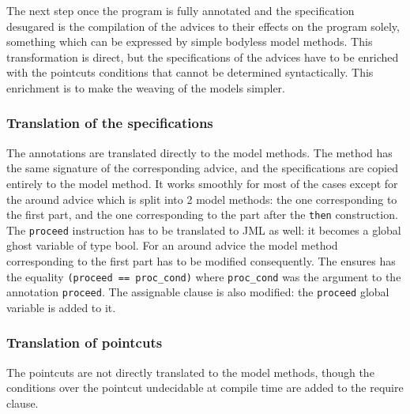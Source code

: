 The next step once the program is fully annotated and the specification desugared is the compilation of the
advices to their effects on the program solely, something  which can be expressed by simple bodyless model 
methods.
This transformation is direct, but the specifications of the advices have to be
 enriched with the pointcuts conditions that cannot be determined syntactically.
This enrichment is to make the weaving of the models simpler.

\subsubsection{Translation of the specifications}
The annotations are translated directly to the model methods. The method has the same signature
 of the corresponding advice, and the specifications are copied entirely to the model method. It works smoothly
for most of the cases except for the around advice which is split into 2 model methods: the one corresponding
to the first part, and the one corresponding to the part after the {\tt then} construction. 
The {\tt proceed} instruction has to be translated to JML as well: it becomes a global 
ghost variable of type bool.
For an around advice the model method corresponding to the first part has to be modified consequently.
The ensures has the equality {\tt (proceed == proc\_cond)} where {\tt proc\_cond} was the argument 
to the annotation {\tt proceed}. The assignable clause is also modified: the {\tt proceed} global variable is 
added to it.
\subsubsection{Translation of pointcuts}
The pointcuts are not directly translated to the model methods, though the conditions over the pointcut undecidable
at compile time are added to the require clause.
